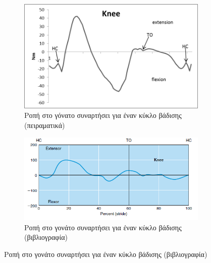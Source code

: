 \begin{figure}[H]
    \centering
    \begin{subfigure}[t]{.48\textwidth}
        \includegraphics[width=\textwidth, keepaspectratio]{fig/id-knee.png}
        \caption{Ροπή στο γόνατο συναρτήσει για έναν κύκλο βάδισης (πειραματικά)}
        \label{fig:knee-moment}
    \end{subfigure}
    \begin{subfigure}[t]{.48\textwidth}
        \includegraphics[width=\textwidth, keepaspectratio]{fig/id-knee-ref.png}
        \caption{Ροπή στο γονάτο συναρτήσει για έναν κύκλο βάδισης (βιβλιογραφία)}
        \label{fig:knee-moment-ref}
    \end{subfigure}


\end{figure}
